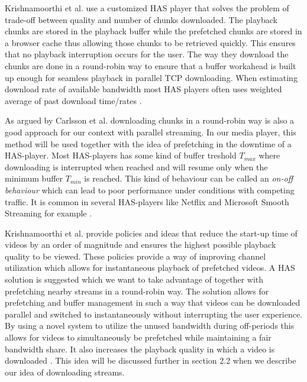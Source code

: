 Krishnamoorthi et al. \cite{qualbranch} use a customized HAS player that solves the problem of trade-off between quality and number of chunks downloaded. The playback chunks are stored in the playback buffer while the prefetched chunks are stored in a browser cache thus allowing those chunks to be retrieved quickly. This ensures that no playback interruption occurs for the user. The way they download the chunks are done in a round-robin way to ensure that a buffer workahead is built up enough for seamless playback in parallel TCP downloading. When estimating download rate of available bandwidth most HAS players often uses weighted average of past download time/rates \cite{qualbranch}. 

As argued by Carlsson et al. \cite{optimizedprefetching} downloading chunks in a round-robin way is also a good approach for our context with parallel streaming. In our media player, this method will be used together with the idea of prefetching in the downtime of a HAS-player. Most HAS-players has some kind of buffer treshold $T_{max}$ where downloading is interrupted when reached and will resume only when the minimum buffer $T_{min}$ is reached. This kind of behaviour can be called an \textit{on-off behaviour} which can lead to poor performance under conditions with competing traffic. It is common in several HAS-players like Netflix and Microsoft Smooth Streaming for example \cite{bandawarePrefetch}. 

Krishnamoorthi et al. \cite{bandawarePrefetch} provide policies and ideas that reduce the start-up time of videos by an order of magnitude and ensures the highest possible playback quality to be viewed. These policies provide a way of improving channel utilization which allows for instantaneous playback of prefetched videos. A HAS solution is suggested which we want to take advantage of together with prefetching nearby streams in a round-robin way. The solution allows for prefetching and buffer management in such a way that videos can be downloaded parallel and switched to instantaneously without interrupting the user experience. By using a novel system to utilize the unused bandwidth during off-periods this allows for videos to simultaneously be prefetched while maintaining a fair bandwidth share. It also increases the playback quality in which a video is downloaded \cite{bandawarePrefetch}. This idea will be discussed further in section 2.2 when we describe our idea of downloading streams.

